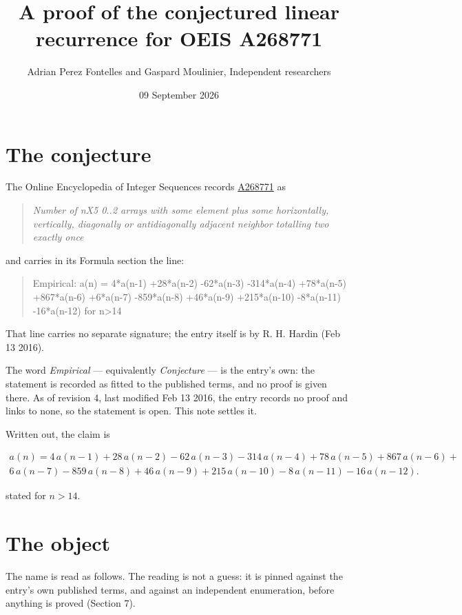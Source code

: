 \documentclass[11pt]{article}
\title{A proof of the conjectured linear recurrence for OEIS A268771}
\author{Adrian Perez Fontelles and Gaspard Moulinier, Independent researchers}
\date{09 September 2026}
\theoremstyle{definition}
\begin{document}
\maketitle
\section{The conjecture}

The Online Encyclopedia of Integer Sequences records \href{https://oeis.org/A268771}{A268771} as

\begin{quote}\itshape Number of nX5 0..2 arrays with some element plus some horizontally, vertically, diagonally or antidiagonally adjacent neighbor totalling two exactly once\end{quote}

and carries in its Formula section the line:

\begin{quote}\ttfamily Empirical: a(n) = 4*a(n-1) +28*a(n-2) -62*a(n-3) -314*a(n-4) +78*a(n-5) +867*a(n-6) +6*a(n-7) -859*a(n-8) +46*a(n-9) +215*a(n-10) -8*a(n-11) -16*a(n-12) for n>14\end{quote}

That line carries no separate signature; the entry itself is by R. H. Hardin (Feb 13 2016).

The word {\itshape Empirical} --- equivalently {\itshape Conjecture} --- is the entry's own: the statement is recorded as fitted to the published terms, and no proof is given there. As of revision 4, last modified Feb 13 2016, the entry records no proof and links to none, so the statement is open. This note settles it.

Written out, the claim is

\begin{multline*} a(n) = 4\,a(n-1) + 28\,a(n-2) - 62\,a(n-3) - 314\,a(n-4) + 78\,a(n-5) + 867\,a(n-6) + \\ 6\,a(n-7) - 859\,a(n-8) + 46\,a(n-9) + 215\,a(n-10) - 8\,a(n-11) - 16\,a(n-12). \end{multline*}

stated for $n > 14$.

\section{The object}

The name is read as follows. The reading is not a guess: it is pinned against the entry's own published terms, and against an independent enumeration, before anything is proved (Section 7).
\end{document}

